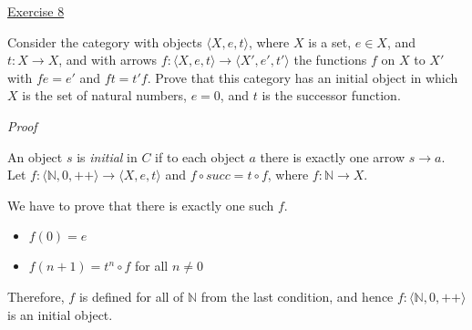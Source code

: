 \noindent
\underline{Exercise 8}
\vspace{2mm}

Consider the category with objects $\langle X, e, t \rangle$, where $X$ is a
set, $e \in X$, and $t: X \to X$, and with arrows $f: \langle X, e, t \rangle
\to \langle X', e', t' \rangle$ the functions $f$ on $X$ to $X'$ with $fe = e'$
and $ft = t'f$. Prove that this category has an initial object in which $X$ is
the set of natural numbers, $e = 0$, and $t$ is the successor function.

\vspace{2mm}

\noindent
\emph{Proof}

An object $s$ is \emph{initial} in $C$ if to each object $a$ there is exactly
one arrow $s \to a$. Let $f: \langle \mathbb{N}, 0, ++ \rangle \to \langle X,
e, t \rangle$ and $f \circ succ = t \circ f$, where $f : \mathbb{N} \to X$.

We have to prove that there is exactly one such $f$. 
\begin{itemize}
    \item $f(0) = e$ 
    \item $f(n + 1) = t^n \circ f$ for all $n \neq 0$
\end{itemize}
    
Therefore, $f$ is defined for all of $\mathbb{N}$ from the last condition, and
hence $f: \langle \mathbb{N}, 0, ++ \rangle$ is an initial object.

\vspace{2mm}
